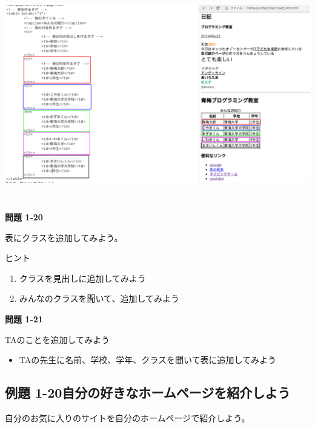 \documentclass[a4paper,12pt]{jarticle}
\begin{document}
\bigskip


\bigskip
\includegraphics[width=15.861cm,height=9.245cm]{textbook-img192.png}




\bigskip

\bigskip

\bigskip

{\bfseries
問題 1-20}

表にクラスを追加してみよう。

ヒント

\begin{enumerate}
\item クラスを見出しに追加してみよう
\item
みんなのクラスを聞いて、追加してみよう
\end{enumerate}
{\bfseries
問題 1-21}

TAのことを追加してみよう

\begin{itemize}
\item
TAの先生に名前、学校、学年、クラスを聞いて表に追加してみよう
\end{itemize}

\bigskip

\clearpage

\subsection{例題
1-20自分の好きなホームページを紹介しよう}
自分のお気に入りのサイトを自分のホームページで紹介しよう。
\end{document}
